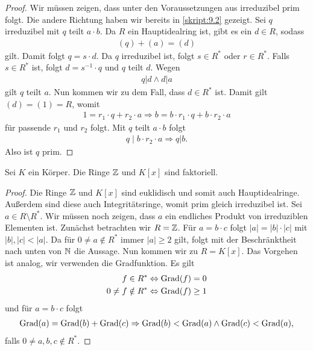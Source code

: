 \begin{proof}
	Wir müssen zeigen, dass unter den Voraussetzungen aus irreduzibel prim folgt.
	Die andere Richtung haben wir bereits in \ref{skript:9.2} gezeigt.
	Sei $ q $ irreduzibel mit $ q $ teilt $ a \cdot b $.
	Da $ R $ ein Hauptidealring ist, gibt es ein $ d \in R $, sodass
	\begin{align*}
	(q) + (a) = (d)
	\end{align*}
	gilt.
	Damit folgt $ q = s \cdot d $.
	Da $ q $ irreduzibel ist, folgt $ s \in R^\ast $ oder $ r \in R^\ast $.
	Falls $ s \in R^\ast $ ist, folgt $ d = s^{-1}  \cdot q$ und $ q $ teilt $ d $.
	Wegen
	\begin{align*}
	q | d \wedge d | a
	\end{align*}
	gilt $ q $ teilt $ a $.
	Nun kommen wir zu dem Fall, dass $ d \in R^\ast $ ist.
	Damit gilt $ (d) = (1)  = R$, womit
	\begin{align*}
	1 = r_1 \cdot q + r_2 \cdot a
	\Rightarrow 
	b = b \cdot r_1 \cdot q +b \cdot r_2 \cdot a
	\end{align*}
	für passende $ r_1  $ und $ r_2 $ folgt.
	Mit $ q $ teilt $ a \cdot b $ folgt
	\begin{align*}
	q \mid b \cdot r_2 \cdot a
	\Rightarrow 
	q | b.
	\end{align*} 
	Also ist $ q $ prim.
\end{proof}

\begin{sz}\label{skript:9.7}
	Sei $ K $ ein Körper.
	Die Ringe $ \mathbb{Z} $ und $ K[x] $ sind faktoriell.
\end{sz}

\begin{proof}
	Die Ringe $ \mathbb{Z} $ und $ K[x] $ sind euklidisch und somit auch Hauptidealringe.
	Außerdem sind diese auch Integritätsringe, womit prim gleich irreduzibel ist.
	Sei $ a \in R \setminus R^\ast $.
	Wir müssen noch zeigen, dass $ a $ ein endliches Produkt von irreduziblen Elementen ist.
	Zunächst betrachten wir $ R = \mathbb{Z} $.
	Für $ a = b \cdot c $ folgt $ |a| = |b| \cdot |c| $ mit $ |b|, |c| < |a| $.
	Da für $ 0 \neq a \notin R^\ast $ immer $ |a| \geq 2 $ gilt, folgt mit der Beschränktheit nach unten von $ \mathbb{N} $ die Aussage.
	Nun kommen wir zu $ R = K[x] $.
	Das Vorgehen ist analog, wir verwenden die Gradfunktion.
	Es gilt
	\begin{align*}
	f \in R^\ast &\Leftrightarrow \operatorname{Grad}(f) = 0 \\
	0 \neq f \notin R^\ast &\Leftrightarrow \operatorname{Grad}(f) \geq 1
	\end{align*}
	und für $ a = b \cdot c $ folgt
	\begin{align*}
	\operatorname{Grad}(a) = \operatorname{Grad}(b ) + \operatorname{Grad}(c)
	\Rightarrow
	\operatorname{Grad}(b) < \operatorname{Grad}(a) \wedge \operatorname{Grad}(c) < \operatorname{Grad}(a),
	\end{align*}
	falls $ 0 \neq a,b,c \notin R^\ast $.
\end{proof}

